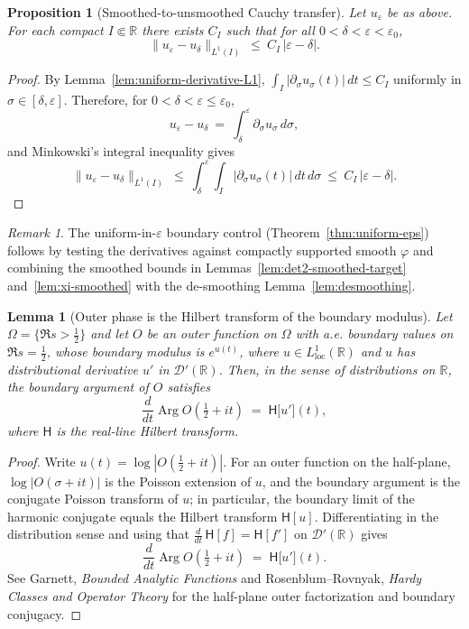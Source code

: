 \documentclass[11pt]{article}
\newtheorem{proposition}[theorem]{Proposition}
\newtheorem{lemma}[theorem]{Lemma}
\theoremstyle{definition}
\theoremstyle{remark}
\newtheorem{remark}[theorem]{Remark}
\newcommand{\R}{\mathbb{R}}
\DeclareMathOperator{\Arg}{Arg}
\begin{document}
\begin{proposition}[Smoothed-to-unsmoothed Cauchy transfer]\label{prop:desmoothing}
Let \(u_\varepsilon\) be as above. For each compact \(I\Subset\R\) there exists \(C_I\) such that for all \(0<\delta<\varepsilon<\varepsilon_0\),
\[
 \|u_\varepsilon-u_\delta\|_{L^1(I)}\ \le\ C_I\,|\varepsilon-\delta|.
\]
\end{proposition}
\begin{proof}
By Lemma~\ref{lem:uniform-derivative-L1}, \(\int_I |\partial_\sigma u_\sigma(t)|\,dt\le C_I\) uniformly in \(\sigma\in[\delta,\varepsilon]\). Therefore, for \(0<\delta<\varepsilon\le\varepsilon_0\),
\[
 u_\varepsilon-u_\delta\ =\ \int_\delta^\varepsilon \partial_\sigma u_\sigma\,d\sigma,
\]
and Minkowski's integral inequality gives
\[
 \|u_\varepsilon-u_\delta\|_{L^1(I)}\ \le\ \int_\delta^\varepsilon\!\int_I |\partial_\sigma u_\sigma(t)|\,dt\,d\sigma\ \le\ C_I\,|\varepsilon-\delta|.
\]
\end{proof}
\begin{remark}
The uniform-in-\(\varepsilon\) boundary control (Theorem~\ref{thm:uniform-eps}) follows by testing the derivatives against compactly supported smooth \(\varphi\) and combining the smoothed bounds in Lemmas~\ref{lem:det2-smoothed-target} and~\ref{lem:xi-smoothed} with the de-smoothing Lemma~\ref{lem:desmoothing}.
\end{remark}
\begin{lemma}[Outer phase is the Hilbert transform of the boundary modulus]\label{lem:outer-phase-HT}
Let \(\Omega=\{\Re s>\tfrac12\}\) and let \(O\) be an outer function on \(\Omega\) with a.e. boundary values on \(\Re s=\tfrac12\), whose boundary modulus is \(e^{u(t)}\), where \(u\in L^1_{\mathrm{loc}}(\R)\) and \(u\) has distributional derivative \(u'\) in \(\mathcal D'(\R)\). Then, in the sense of distributions on \(\R\), the boundary argument of \(O\) satisfies
\[
 \frac{d}{dt}\Arg O\!\left(\tfrac12+it\right)\;=\; \mathsf H\big[u'\big](t),
\]
where \(\mathsf H\) is the real-line Hilbert transform.
\end{lemma}
\begin{proof}
Write \(u(t)=\log|O(\tfrac12+it)|\). For an outer function on the half-plane, \(\log|O(\sigma+it)|\) is the Poisson extension of \(u\), and the boundary argument is the conjugate Poisson transform of \(u\); in particular, the boundary limit of the harmonic conjugate equals the Hilbert transform \(\mathsf H[u]\). Differentiating in the distribution sense and using that \(\tfrac{d}{dt}\,\mathsf H[f]=\mathsf H[f']\) on \(\mathcal D'(\R)\) gives
\[
 \frac{d}{dt}\Arg O\!\left(\tfrac12+it\right)\;=\; \mathsf H\big[u'\big](t).
\]
See Garnett, \emph{Bounded Analytic Functions} \cite[Ch.~II, §2 (Poisson integral), §5 (outer functions)]{Garnett} and Rosenblum–Rovnyak, \emph{Hardy Classes and Operator Theory} \cite[Ch.~2, §3]{RosenblumRovnyak} for the half-plane outer factorization and boundary conjugacy.
\end{proof}
\end{document}
